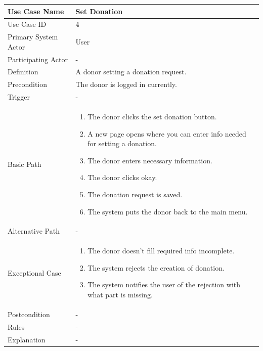 \documentclass[a4paper,12pt]{report}
\begin{document}
		\begin{tabular}{|m{4cm}|m{11.5cm}|}
			\hline
				Use Case Name & Set Donation\\
			\hline
				Use Case ID & 4\\
			\hline
				Primary System Actor & User\\
			\hline
				Participating Actor & -\\
			\hline
				Definition & A donor setting a donation request.\\
			\hline
				Precondition & The donor is logged in currently.\\
			\hline
				Trigger & -\\
			\hline
				Basic Path & \begin{enumerate}
					\item The donor clicks the set donation button.
					\item A new page opens where you can enter info needed for setting a donation.
					\item The donor enters necessary information.
					\item The donor clicks okay.
					\item The donation request is saved.
					\item The system puts the donor back to the main menu.
				\end{enumerate}		
				\\
			\hline
				Alternative Path & -\\
			\hline
				Exceptional Case & \begin{enumerate}
					\item The donor doesn't fill required info incomplete.
					\item The system rejects the creation of donation.
					\item The system notifies the user of the rejection with what part is missing.
				\end{enumerate}
				\\
			\hline
				Postcondition & -\\
			\hline
				Rules & -\\
			\hline
				Explanation & -\\
			\hline
		\end{tabular}
\end{document}
